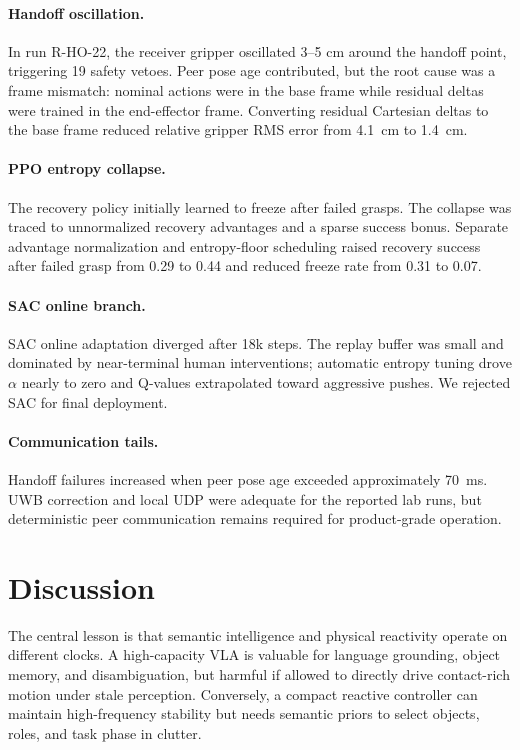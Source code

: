 \documentclass[10pt,twocolumn]{article}
\begin{document}
\paragraph{Handoff oscillation.}
In run R-HO-22, the receiver gripper oscillated 3--5 cm around the handoff point, triggering 19 safety vetoes. Peer pose age contributed, but the root cause was a frame mismatch: nominal actions were in the base frame while residual deltas were trained in the end-effector frame. Converting residual Cartesian deltas to the base frame reduced relative gripper RMS error from \SI{4.1}{cm} to \SI{1.4}{cm}.

\paragraph{PPO entropy collapse.}
The recovery policy initially learned to freeze after failed grasps. The collapse was traced to unnormalized recovery advantages and a sparse success bonus. Separate advantage normalization and entropy-floor scheduling raised recovery success after failed grasp from 0.29 to 0.44 and reduced freeze rate from 0.31 to 0.07.

\paragraph{SAC online branch.}
SAC online adaptation diverged after 18k steps. The replay buffer was small and dominated by near-terminal human interventions; automatic entropy tuning drove $\alpha$ nearly to zero and Q-values extrapolated toward aggressive pushes. We rejected SAC for final deployment.

\paragraph{Communication tails.}
Handoff failures increased when peer pose age exceeded approximately \SI{70}{ms}. UWB correction and local UDP were adequate for the reported lab runs, but deterministic peer communication remains required for product-grade operation.

\section{Discussion}

The central lesson is that semantic intelligence and physical reactivity operate on different clocks. A high-capacity VLA is valuable for language grounding, object memory, and disambiguation, but harmful if allowed to directly drive contact-rich motion under stale perception. Conversely, a compact reactive controller can maintain high-frequency stability but needs semantic priors to select objects, roles, and task phase in clutter.
\end{document}
